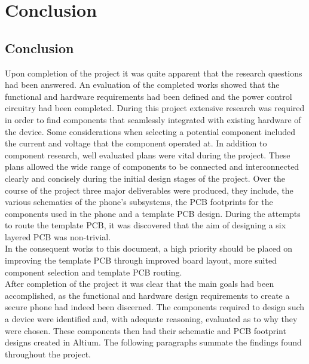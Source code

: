 
\chapter{Conclusion} %

\label{Chapter8} %

\section{Conclusion}

	Upon completion of the project it was quite apparent that the research questions had been answered. An evaluation of the completed works showed that the functional and hardware requirements had been defined and the power control circuitry had been completed. During this project extensive research was required in order to find components that seamlessly integrated with existing hardware of the device. Some considerations when selecting a potential component included the current and voltage that the component operated at. In addition to component research, well evaluated plans were vital during the project. These plans allowed the wide range of components to be connected and interconnected clearly and concisely during the initial design stages of the project. Over the course of the project three major deliverables were produced, they include, the various schematics of the phone's subsystems, the PCB footprints for the components used in the phone and a template PCB design. During the attempts to route the template PCB, it was discovered that the aim of designing a six layered PCB was non-trivial.\\
	In the consequent works to this document, a high priority should be placed on improving the template PCB through improved board layout, more suited component selection and template PCB routing. \\

	After completion of the project it was clear that the main goals had been accomplished, as the functional and hardware design requirements to create a secure phone had indeed been discerned. The components required to design such a device were identified and, with adequate reasoning, evaluated as to why they were chosen. These components then had their schematic and PCB footprint designs created in Altium. The following paragraphs summate the findings found throughout the project.\\

